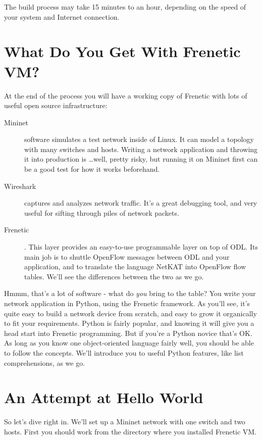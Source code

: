The build process may take 15 minutes to an hour, depending on the speed of your system and Internet connection. 

\section{What Do You Get With Frenetic VM?}

At the end of the process you will have a working copy of Frenetic with lots of useful open source infrastructure:

\begin{description}
\item[Mininet] software simulates a test network inside of Linux.  
It can model a topology with many switches and hosts.  
Writing a network application and throwing it into production is \ldots well, pretty risky, but running it on Mininet first can be a good test for how it works beforehand.  
\item[Wireshark] captures and analyzes network traffic.  
It's a great debugging tool, and very useful for sifting through piles of network packets.
\item[Frenetic].  This layer provides an easy-to-use programmable layer on top of ODL.  Its main job is to shuttle OpenFlow messages between ODL and your application, and to translate the language NetKAT into OpenFlow flow tables.  We'll see the differences between the two as we go.
\end{description}

Hmmm, that's a lot of software - what do {\it you} bring to the table?  You write your network application in Python, using the Frenetic framework.  As you'll see, it's quite easy to build a network device from scratch, and easy to grow it organically to fit your requirements.  Python is fairly popular, and knowing it will give you  a head start into Frenetic programming.  But if you're a Python novice that's OK.  As long as you know one object-oriented language fairly well, you should be able to follow the concepts.  We'll introduce you to useful Python features, like list comprehensions, as we go.  

\section{An Attempt at Hello World}

So let's dive right in.  We'll set up a Mininet network with one switch and two hosts.  First you should work from the directory where you installed Frenetic VM.

